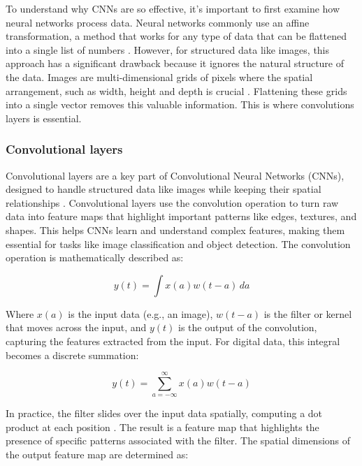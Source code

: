 To understand why CNNs are so effective, it's important to first examine how neural networks process data. Neural networks commonly use an affine transformation, a method that works for any type of data that can be flattened into a single list of numbers \cite{deepai_affine_layer}. However, for structured data like images, this approach has a significant drawback because it ignores the natural structure of the data. Images are multi-dimensional grids of pixels where the spatial arrangement, such as width, height and depth is crucial \cite{cs231n_cnn}. Flattening these grids into a single vector removes this valuable information. This is where convolutions layers is essential.

\subsubsection{Convolutional layers}

Convolutional layers are a key part of Convolutional Neural Networks (CNNs), designed to handle structured data like images while keeping their spatial relationships \cite{cs231n_cnn}. Convolutional layers use the convolution operation to turn raw data into feature maps that highlight important patterns like edges, textures, and shapes. This helps CNNs learn and understand complex features, making them essential for tasks like image classification and object detection. The convolution operation is mathematically described as:

\begin{equation}
    y(t) = \int x(a)w(t-a) \, da
    \label{contionous_conv_operation}
\end{equation}

Where \( x(a) \) is the input data (e.g., an image), \( w(t-a) \) is the filter or kernel that moves across the input, and \( y(t) \) is the output of the convolution, capturing the features extracted from the input. For digital data, this integral becomes a discrete summation:

\begin{equation}
    y(t) = \sum_{a=-\infty}^{\infty} x(a)w(t-a)
\end{equation}


In practice, the filter slides over the input data spatially, computing a dot product at each position \cite{cs231n_cnn}. The result is a feature map that highlights the presence of specific patterns associated with the filter. 
The spatial dimensions of the output feature map are determined as:

